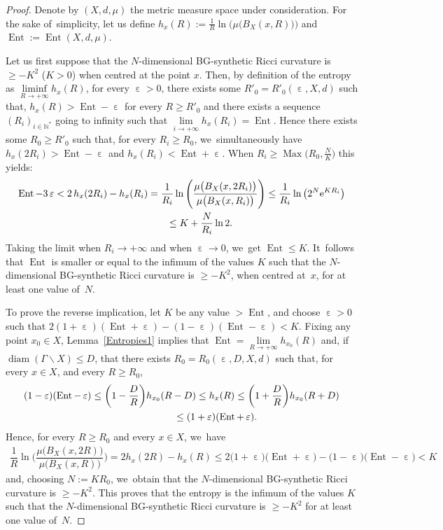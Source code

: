 \documentclass[10pt,a4paper]{amsart}
\numberwithin{equation}{section}
\newcommand{\N}{\mathbb{N}}
\newcommand{\f}{\rightarrow}
\newcommand{\Ent}{\operatorname{Ent}}
\newcommand{\Max}{\operatorname{Max}}
\newcommand{\diam}{\operatorname{diam}}
\newcommand{\e}{\operatorname{\varepsilon}}
\begin{document}
\begin{proof}
Denote by $ (X,d, \mu) $ the metric measure space under consideration. For the sake of~sim\-p\-li\-city, let us define $h_x (R) := \frac{1}{R}
\ln \big(\mu \big( B_X (x, R) \big)\big)$ and $\Ent := \Ent (X,d,\mu)$.

Let us first suppose that the $N$-dimensional BG-synthetic Ricci curvature is $\ge -K^2$ ($K> 0$) when centred at the point $x$. Then, by definition of the entropy as
$\liminf\limits_{R\to +\infty} h_x (R)$, for every $\e > 0$, there exists some $R'_0 = R'_0 (\e, X, d)$ such that, $ h_x(R) > \Ent - \e$ for every $R
\ge R'_0$
and there exists a sequence $(R_i)_{i \in \N^*}$ going to infinity such that $\lim\limits_{i \to +\infty} h_x(R_i) = \Ent $. Hence there exists some
$R_0 \ge R'_0$ such that, for every $R_i \ge R_0$, we~simultaneously have
$h_x (2 R_i) > \Ent - \e$ and $h_x(R_i) < \Ent + \e$.
When $R_i \ge \Max \big(R_0, \frac{N}{K} \big)$ this yields:
\begin{gather*}
\Ent - 3 \e < 2\, h_x(2 R_i) - h_x(R_i) = \dfrac{1}{R_i} \ln \Bigg(\frac{\mu \big(B_X (x, 2 R_i)\big)}{\mu \big( B_X (x, R_i) \big)} \Bigg) \le \dfrac{1}{R_i} \ln \big( 2^N {\rm e}^{K R_i}\big)
\\ \hphantom{\Ent - 3 \e }
{}\le K + \frac{N}{R_i} \ln 2.
\end{gather*}
Taking the limit when $R_i \f + \infty$ and when $\e \f 0$, we~get $\Ent
\le K$. It~follows that $\Ent $ is smaller or equal to the infimum
of the values $K$ such that the $N$-dimensional BG-synthetic Ricci curvature is $\ge -K^2$, when centred at~$x$, for at least one value of~$N$.

To prove the reverse implication, let $K$ be any value $> \Ent $, and choose $\e> 0$ such that
$ 2 (1+\e) (\Ent + \e) - (1-\e) (\Ent - \e) < K$. Fixing any point $x_0 \in X$,
Lemma~\ref{Entropies1} implies that $\Ent = \lim\limits_{R \to +\infty} h_{x_0}(R)$ and, if $\diam (\Gamma \backslash X) \le D$, that there exists
$R_0 = R_0 (\e, D, X, d)$ such that, for every $x \in X$, and every $R \ge R_0$,
\begin{gather*}
(1 - \e) (\Ent - \e) \le \bigg(1 - \frac{D}{R}\bigg) h_{x_0} (R-D) \le h_x (R) \le \bigg(1 + \frac{D}{R}\bigg) h_{x_0} (R+ D)
\\ \hphantom{(1 - \e) (\Ent - \e) }
{}\le (1 + \e)(\Ent +\e).
\end{gather*}
Hence, for every $R\ge R_0$ and every $ x \in X$, we~have
\begin{gather*}
\dfrac{1}{R} \ln\Bigg(\!\dfrac{\mu \big( B_X(x, 2 R)\big)}{\mu \big( B_X(x, R)\big)}\!\Bigg)\! = 2 h_x( 2 R) - h_x(R) \le 2 \big(1+\e\big) \big(\Ent + \e \big) - \big(1-\e\big) \big(\Ent - \e \big)\! < K
\end{gather*}
and, choosing $N := K R_0$, we~obtain that the $N$-dimensional BG-synthetic Ricci curvature is $\ge -K^2$.
This proves that the entropy is the infimum of the values $K$ such that the $N$-dimensional BG-synthetic Ricci curvature is $\ge -K^2$ for at least one value
of~$N$.


\end{proof}
\end{document}
